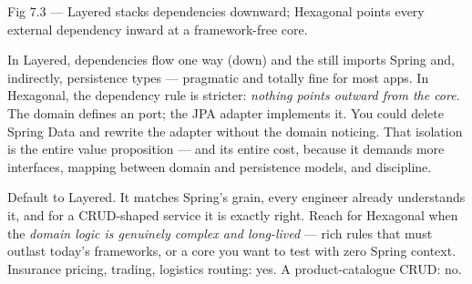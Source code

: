 \begin{wbfigure}{Fig 7.3 — Layered stacks dependencies downward; Hexagonal points every external dependency inward at a framework-free core.}
\end{wbfigure}

 In Layered, dependencies flow one way (down) and the  still imports Spring and, indirectly, persistence types --- pragmatic and totally fine for most apps. In Hexagonal, the dependency rule is stricter: \emph{nothing points outward from the core}. The domain defines an  port; the JPA adapter implements it. You could delete Spring Data and rewrite the adapter without the domain noticing. That isolation is the entire value proposition --- and its entire cost, because it demands more interfaces, mapping between domain and persistence models, and discipline.

 Default to Layered. It matches Spring's grain, every engineer already understands it, and for a CRUD-shaped service it is exactly right. Reach for Hexagonal when the \emph{domain logic is genuinely complex and long-lived} --- rich rules that must outlast today's frameworks, or a core you want to test with zero Spring context. Insurance pricing, trading, logistics routing: yes. A product-catalogue CRUD: no.

